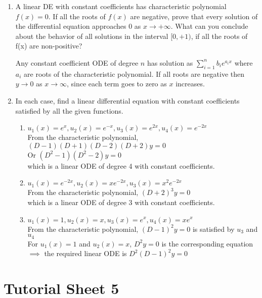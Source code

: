 \documentclass[a4paper]{article}
\begin{document}
\begin{enumerate}
\item A linear DE with constant coefficients has characteristic polynomial $f(x) = 0$. If all the roots of $f(x)$ are negative, prove that every solution of the differential equation approaches 0 as $x \to +\infty$. What can you conclude about the behavior of all solutions in the interval $[0,+1)$, if all the roots of f(x) are non-positive?

Any constant coefficient ODE of degree $n$ has solution as $\sum_{i=1}^{n}b_ie^{a_ix}$ where $a_i$ are roots of the characteristic polynomial. If all roots are negative then $y\to 0$ as $x \to \infty$, since each term goes to zero as $x$ increases.

\item In each case, find a linear differential equation with constant coefficients satisfied by all the given functions.
\begin{enumerate}
	\item $u_1(x)=e^x,u_2(x)=e^{-x},u_3(x)=e^{2x},u_4(x)=e^{-2x}$\\
	From the characteristic polynomial, $(D-1)(D+1)(D-2)(D+2)y=0$\\
	Or $(D^2-1)(D^2-2)y=0$\\
	which is a linear ODE of degree 4 with constant coefficients.
	
	\item $u_1(x)=e^{-2x},u_2(x)=xe^{-2x},u_3(x)=x^2e^{-2x}$\\
	From the characteristic polynomial, $(D+2)^3y=0$\\
	which is a linear ODE of degree 3 with constant coefficients.
	
	\item $u_1(x)=1, u_2(x)=x,u_3(x)=e^x,u_4(x)=xe^x$\\
	From the characteristic polynomial, $(D-1)^2y=0$ is satisfied by $u_3$ and $u_4$\\
	For $u_1(x)=1$ and $u_2(x)=x$, $D^2y=0$ is the corresponding equation\\
	$\implies$ the required linear ODE is $D^2(D-1)^2y=0$
	
\end{enumerate}

\end{enumerate}

\section{Tutorial Sheet 5}
\end{document}
